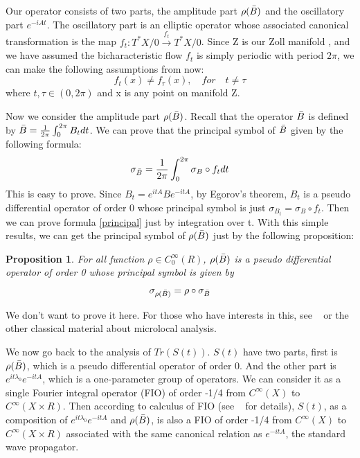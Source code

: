 \documentclass[10pt]{amsart}
\newtheorem{proposition}[theorem]{Proposition}
\newcommand{\1}{\mathbb{1}}
\begin{document}
Our operator consists of two parts, the amplitude part $\rho(\Bar{B})$ and the oscillatory part $e^{-iAt}$. The oscillatory part is an elliptic operator whose associated canonical transformation is the map $f_t: T^{*}X/0 \xrightarrow{f_t} T^{*}X/0$. Since Z is our Zoll manifold , and we have assumed the bicharacteristic flow $f_t$ is simply periodic with period $2\pi$, we can make the following assumptions from now:
\begin{equation}
    f_t(x) \ne f_{\tau} (x) , \quad for \quad t \ne \tau
\end{equation}
where $t,\tau \in (0,2\pi)$ and x is any point on manifold Z.

Now we consider the amplitude part $\rho (\Bar{B})$. Recall that the operator $\Bar{B}$ is defined by $\Bar{B} = \frac{1}{2\pi} \int_0^{2\pi} B_t dt$. We can prove that the principal symbol of $\Bar{B}$ given by the following formula:
\begin{equation}\label{principal}
    \sigma_{\Bar{B}} = \frac{1}{2\pi} \int_0^{2\pi} \sigma_B \circ f_t dt
\end{equation}
This is easy to prove. Since $B_t = e^{itA}B e^{-itA}$, by Egorov's theorem, $B_t$ is a pseudo differential operator of order 0 whose principal symbol is just $\sigma_{B_t} = \sigma_B \circ f_t $. Then we can prove formula \eqref{principal} just by integration over t. With this simple results, we can get the principal symbol of $\rho(\Bar{B})$ just by the following proposition:

\begin{proposition}
    For all function $\rho \in C^{\infty}_0(R)$, $\rho(\Bar{B})$ is a pseudo differential operator of order 0 whose principal symbol is given by
    \[
    \sigma_{\rho(\Bar{B})} = \rho \circ \sigma_{\Bar{B}}
    \]
\end{proposition}
We don't want to prove it here. For those who have interests in this, see ~\cite{Wein77} or the other classical material about microlocal analysis.

We now go back to the analysis of $Tr(S(t))$. $S(t)$ have two parts, first is $\rho(\Bar{B})$, which is a pseudo differential operator of order 0. And the other part is $e^{it\lambda_0}e^{-itA}$, which is a one-parameter group of operators. We can consider it as a single Fourier integral operator (FIO) of order -1/4 from $C^{\infty}(X)$ to $C^{\infty}(X \times R)$. Then according to calculus of FIO (see ~\cite{FIO2} for details), $S(t)$, as a composition of $e^{it\lambda_0}e^{-itA}$ and $\rho(\Bar{B})$, is also a FIO of order -1/4 from $C^{\infty}(X)$ to $C^{\infty}(X \times R)$ associated with the same canonical relation as $e^{-itA}$, the standard wave propagator.
\end{document}
